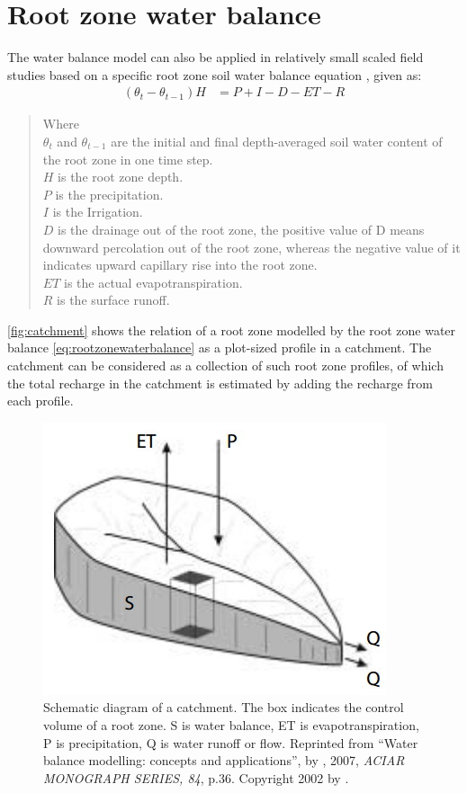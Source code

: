 \section{Root zone water balance}
 The water balance model can also be applied in relatively small scaled field studies based on a specific root zone soil water balance equation \citep{Ma2013}, given as:
\begin{align}
(\theta_t - \theta_{t-1})H &= P+I-D-ET-R\label{eq:rootzonewaterbalance}
\end{align}
\begin{quote}
Where \\
$\theta_t$ and $\theta_{t-1}$ are the initial and final depth-averaged soil water content of the root zone in one time step. \\
$H$ is the root zone depth.\\
$P$ is the precipitation.\\
$I$ is the Irrigation.\\
$D$ is the drainage out of the root zone, the positive value of D means downward percolation out of the root zone, whereas the negative value of it indicates upward capillary rise into the root zone.\\ $ET$ is the actual evapotranspiration.\\
$R$ is the surface runoff. 
\end{quote}
\autoref{fig:catchment} shows the relation of a root zone modelled by the root zone water balance \autoref{eq:rootzonewaterbalance} as a plot-sized profile in a catchment. The catchment can be considered as a collection of such root zone profiles, of which the total recharge in the catchment is estimated by adding the recharge from each profile. \\
\begin{figure}[bth]
\begin{center}
\includegraphics[width=0.5\linewidth]{gfx/catchment}
\caption{Schematic diagram of a catchment\citep{Zhang2002}. The box indicates the control volume of a root zone. S is water balance, ET is evapotranspiration, P is precipitation, Q is water runoff or flow. Reprinted from ``Water balance modelling: concepts and applications'', by \citeauthor{Zhang2002}, 2007, \emph{ACIAR MONOGRAPH SERIES, 84}, p.36. Copyright 2002 by \citeauthor{Zhang2002}. }\label{fig:catchment}
\end{center}
\end{figure}
